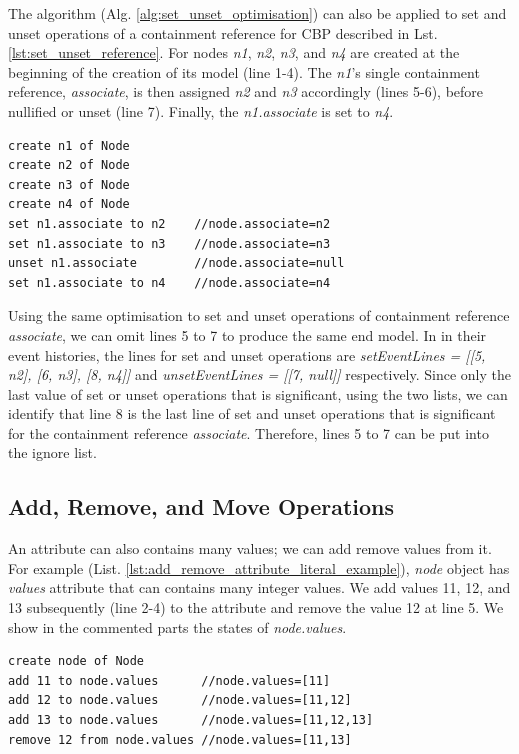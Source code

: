 \documentclass{llncs}
\begin{document}
The algorithm (Alg. \ref{alg:set_unset_optimisation}) can also be applied to set and unset operations of a containment reference for CBP described in Lst. \ref{lst:set_unset_reference}. For nodes \emph{n1}, \emph{n2}, \emph{n3}, and \emph{n4} are created at the beginning of the creation of its model (line 1-4). The \emph{n1}'s single containment reference, \emph{associate}, is then assigned \emph{n2} and \emph{n3} accordingly (lines 5-6), before nullified or unset (line 7). Finally, the \emph{n1.associate} is set to \emph{n4}. 

\begin{lstlisting}[style=eol,caption={Example of CBP representation of \emph{name} reference assignments.},label=lst:set_unset_reference]
create n1 of Node
create n2 of Node
create n3 of Node
create n4 of Node
set n1.associate to n2    //node.associate=n2
set n1.associate to n3    //node.associate=n3
unset n1.associate        //node.associate=null
set n1.associate to n4    //node.associate=n4
\end{lstlisting}

Using the same optimisation to set and unset operations of containment reference \emph{associate}, we can omit lines 5 to 7 to produce the same end model. In in their event histories, the lines for set and unset operations are \emph{setEventLines = [[5, n2], [6, n3], [8, n4]]} and \emph{unsetEventLines = [[7, null]]} respectively. Since only the last value of set or unset operations that is significant, using the two lists, we can identify that line 8 is the last line of set and unset operations that is significant for the containment reference \emph{associate}. Therefore, lines 5 to 7 can be put into the ignore list.

\subsection{Add, Remove, and Move Operations}
\label{subsec:add_remove_and_move_operations}
An attribute can also contains many values; we can add remove values from it. For example (List. \ref{lst:add_remove_attribute_literal_example}), \emph{node} object has \emph{values} attribute that can contains many integer values. We add values 11, 12, and 13 subsequently (line 2-4) to the attribute and remove the value 12 at line 5. We show in the commented parts the states of \emph{node.values}.  

\begin{lstlisting}[style=eol,caption={Example of CBP representation of attribute \emph{values}'s add and remove operations.},label=lst:add_remove_move_attribute]
create node of Node
add 11 to node.values      //node.values=[11] 
add 12 to node.values      //node.values=[11,12] 
add 13 to node.values      //node.values=[11,12,13] 
remove 12 from node.values //node.values=[11,13] 
\end{lstlisting}
\end{document}
